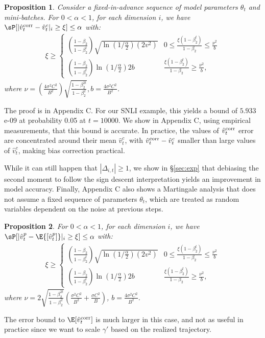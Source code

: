 \documentclass[letterpaper]{article} %
\newtheorem{proposition}{Proposition}
\begin{document}
\begin{proposition}
\label{prop:bound_fixed}
Consider a fixed-in-advance sequence of model parameters $\theta_t$ and mini-batches.
For $0 < \alpha < 1$, for each dimension $i$, we have $\sP[\lvert
 \hat{v}_t^{\textnormal{corr}} - \hat{v}_t^c \rvert_i \geq \xi ] \leq \alpha$ with:
\begin{align*}
    \xi \geq
    \begin{cases}
        (\frac{1-\beta_2}{1-\beta_2^t}) \sqrt{\ln{(1/\frac{\alpha}{2})}(2v^2)}
        & 0 \leq \frac{\xi(1-\beta_2^t)}{1-\beta_2}  \leq \frac{\nu^2}{b} \\
        (\frac{1-\beta_2}{1-\beta_2^t}) \ln{(1/\frac{\alpha}{2})}2b
        & \frac{\xi(1-\beta_2^t)}{1-\beta_2}    \geq \frac{\nu^2}{b},
    \end{cases}
\end{align*}
where $\nu = (\frac{4\sigma^2C^2}{B^2})\sqrt{\frac{1-\beta_2^{2t}}{1-\beta_2^2}}, b=\frac{4\sigma^2C^2}{B^2}$.
\end{proposition}
The proof is in Appendix C.
For our SNLI example, this yields a bound of $5.933$e-09 at probability 0.05 at $t=10000$. We show in Appendix C, using empirical measurements, that this bound is accurate.
In practice, the values of $\hat{v}_t^{\textnormal{corr}}$ error are concentrated around their mean $\hat{v}_t^c$, with $\hat{v}_t^{\textnormal{corr}} - \hat{v}_t^c$ smaller than large values of $\hat{v}_t^c$, making bias correction practical.

While it can still happen that $|\Delta_{i, t}| \geq 1$, we show in \S\ref{sec:exp} that debiasing the second moment to follow the sign descent interpretation yields an improvement in model accuracy.
Finally, Appendix C also shows a Martingale analysis that does not assume a fixed sequence of parameters $\theta_t$, which are treated as random variables dependent on the noise at previous steps.
\begin{proposition}
\label{prop:bound_martingale}
    For $0 < \alpha < 1$, for each dimension $i$, we have $\sP[\lvert \hat{v}_t^p - \E{[\hat{v}_t^p]} \rvert_i \geq \xi] \leq \alpha$ with:
    \begin{align*}
    \xi \geq
    \begin{cases}
        (\frac{1-\beta_2}{1-\beta_2^t}) \sqrt{\ln{(1/\frac{\alpha}{2})}(2v^2)}
        & 0 \leq \frac{\xi(1-\beta_2^t)}{1-\beta_2}  \leq \frac{\nu^2}{b} \\
        (\frac{1-\beta_2}{1-\beta_2^t}) \ln{(1/\frac{\alpha}{2})}2b
        & \frac{\xi(1-\beta_2^t)}{1-\beta_2}  \geq \frac{\nu^2}{b},
    \end{cases}
\end{align*}
where $\nu = 2\sqrt{\frac{1-\beta_2^{2t}}{1-\beta_2^2}}( \frac{\sigma^2C^2}{B^2} + \frac{\sigma C^2}{B} )$, $b = \frac{4\sigma^2C^2}{B^2}$.
\end{proposition}
The error bound to $\E[\hat{v}_t^{\textnormal{corr}}]$ is much larger in this case, and not as useful in practice since we want to scale $\gamma'$ based on the realized trajectory.
\end{document}
